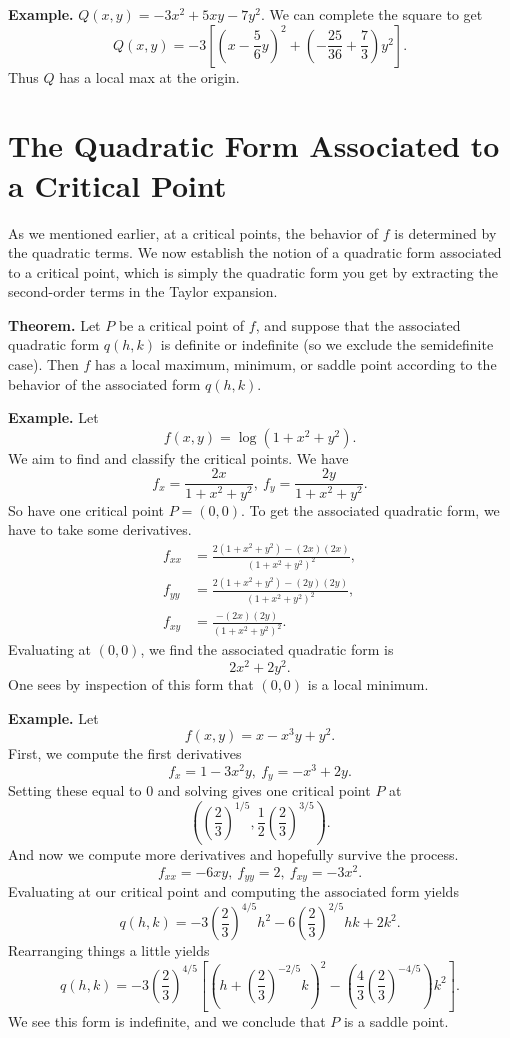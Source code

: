 \documentclass{article}
\begin{document}
\textbf{Example.} $Q(x,y) = -3x^2 + 5xy - 7y^2$. We can complete the square
to get 
\[Q(x,y) = -3 \left[ \left( x - \frac{5}{6}y \right)^2 + \left( -\frac{25}{36} + \frac{7}{3} \right)y^2  \right].\]
Thus $Q$ has a local max at the origin.

\section*{The Quadratic Form Associated to a Critical Point}

As we mentioned earlier, at a critical points, the behavior of $f$ 
is determined by the quadratic terms. We now establish the notion of a 
quadratic form associated to a critical point, which is simply the quadratic
form you get by extracting the second-order terms in the Taylor expansion.

\textbf{Theorem.} Let $P$ be a critical point of $f$, and suppose that
the associated quadratic form $q(h,k)$ is definite or indefinite (so we exclude 
the semidefinite case). Then $f$ has a local maximum, minimum, or 
saddle point according to the behavior of the associated form $q(h,k)$.

\textbf{Example.} Let 
\[f(x,y) = \log(1+x^2+y^2).\]
We aim to find and classify the critical points. We have 
\[f_{x} = \frac{2x}{1+x^2+y^2},\ f_{y} = \frac{2y}{1+x^2+y^2}.\]
So have one critical point $P = (0,0)$. To get the associated quadratic
form, we have to take some derivatives.
\begin{align*}
    f_{xx} &= \frac{2(1+x^2+y^2) - (2x)(2x)}{(1+x^2+y^2)^2},\\
    f_{yy} &= \frac{2(1+x^2+y^2) - (2y)(2y)}{(1+x^2+y^2)^2},\\
    f_{xy} &= \frac{-(2x)(2y)}{(1+x^2+y^2)^2}.
\end{align*}
Evaluating at $(0,0)$, we find the associated quadratic form is 
\[2x^2 + 2y^2.\]
One sees by inspection of this form that $(0,0)$ is a local minimum. 

\textbf{Example.} Let 
\[f(x,y) = x - x^3y + y^2.\]
First, we compute the first derivatives 
\[f_x = 1 - 3x^2y,\ f_y = -x^3 + 2y.\]
Setting these equal to $0$ and solving gives one critical point $P$
at
\[ \left( \left(\frac{2}{3}\right)^{1/5}, \frac{1}{2} \left(\frac{2}{3}\right)^{3/5} \right). \]
And now we compute more derivatives and hopefully survive the process.
\[ f_{xx} = -6xy,\ f_{yy} = 2,\ f_{xy} = -3x^2.\]
Evaluating at our critical point and computing the associated form yields
\[q(h,k) = -3 \left( \frac{2}{3} \right)^{4/5} h^2 - 6\left( \frac{2}{3} \right)^{2/5}hk + 2k^2.\]
Rearranging things a little yields
\[q(h,k) = -3  \left( \frac{2}{3} \right)^{4/5} \left[ \left( h
 + \left( \frac{2}{3} \right)^{-2/5} k \right)^2 
 - \left( \frac{4}{3} \left( \frac{2}{3} \right)^{-4/5} \right) k^2 \right].\]
 We see this form is indefinite, and we conclude that $P$ is a saddle point.
\end{document}
